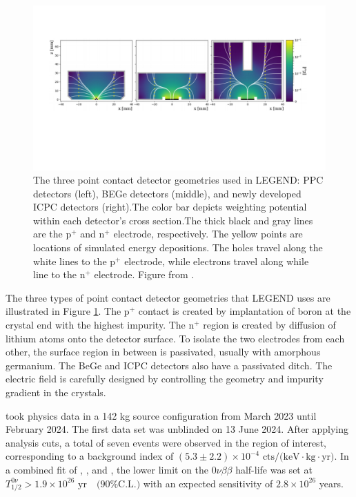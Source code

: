\begin{figure}[!htb]
  \includegraphics[trim=15 30 15 20,clip,width=\linewidth]{ch2/figs/Det-geo-2.pdf}
\caption{The three point contact detector geometries used in LEGEND: {\MJD} PPC detectors (left), {\Gerda} BEGe detectors (middle), and newly developed ICPC detectors (right).The color bar depicts weighting potential within each detector's cross section.The thick black and gray lines are the p$^+$ and n$^+$ electrode, respectively. The yellow points are locations of simulated energy depositions. The holes travel along the white lines to the p$^+$ electrode, while electrons travel along while line to the n$^+$ electrode. Figure from \cite{Comellato:2020ljj}.}
\label{fig:det-compare}
  \end{figure}
  
The three types of point contact detector geometries that LEGEND uses are illustrated in Figure \ref{fig:det-compare}. The p$^+$ contact is created by implantation of boron at the crystal end with the highest impurity. The n$^+$ region is created by diffusion of lithium atoms onto the detector surface. To isolate the two electrodes from each other, the surface region in between is passivated, usually with amorphous germanium. The BeGe and ICPC detectors also have a passivated ditch. The electric field is carefully designed by controlling the geometry and impurity gradient in the crystals. 


{\Ltwo} took physics data in a 142 kg source configuration from March 2023 until February 2024. The first data set was unblinded on 13 June 2024. After applying analysis cuts, a total of seven events were observed in the region of interest, corresponding to a background index of $ (5.3 \pm 2.2) \times 10^{-4} \text{ cts/(keV$\cdot$kg$\cdot$yr)}$. In a combined fit of {\Gerda}, {\MJD}, and {\Ltwo}, the lower limit on the 0$\nu\beta\beta$ half-life was set at $T^{0\nu}_{1/2} > 1.9 \times 10^{26} \text{ yr} \quad \text{(90\% C.L.)}$ with an expected sensitivity of $2.8 \times 10^{26}$ years. \cite{Pertoldi2024}

